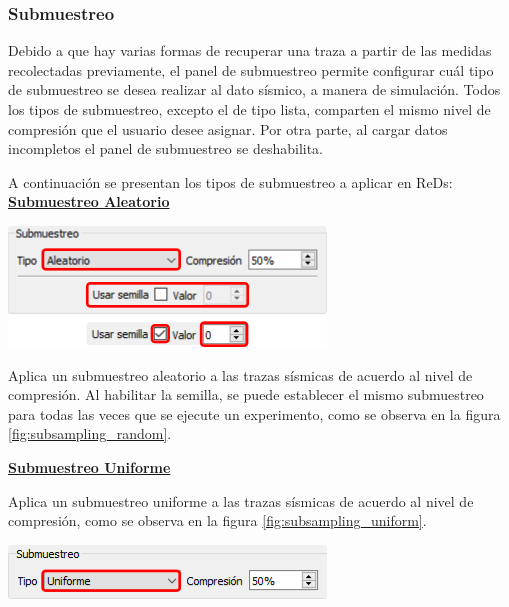 \documentclass[12pt,twoside,letter]{ol-softwaremanual}
\newcommand*\circled[1]{\tikz[baseline=(char.base)]{
            \node[shape=circle,draw,inner sep=2pt] (char) {#1};}}
\newenvironment{Figure}
  {\par\medskip\noindent\minipage{\linewidth}}
  {\endminipage\par\medskip}
\begin{document}
\subsubsection{Submuestreo}\label{subsampling}

Debido a que hay varias formas de recuperar una traza a partir de las medidas recolectadas previamente, el panel de submuestreo \circled{4} permite configurar cuál tipo de submuestreo se desea realizar al dato sísmico, a manera de simulación. Todos los tipos de submuestreo, excepto el de tipo lista, comparten el mismo nivel de compresión que el usuario desee asignar. Por otra parte, al cargar datos incompletos el panel de submuestreo se deshabilita.

A continuación se presentan los tipos de submuestreo a aplicar en ReDs:\\

\underline{\textbf{Submuestreo Aleatorio}}

\begin{multicols}{2}
\begin{Figure}
	\centering
	\includegraphics[width=0.8\linewidth]{subsampling-random.png}
	\label{fig:subsampling_random}
\end{Figure}

Aplica un submuestreo aleatorio a las trazas sísmicas de acuerdo al nivel de compresión. Al habilitar la semilla, se puede establecer el mismo submuestreo para todas las veces que se ejecute un experimento, como se observa en la figura \ref{fig:subsampling_random}.

\end{multicols}

\underline{\textbf{Submuestreo Uniforme}}

\begin{multicols}{2}

Aplica un submuestreo uniforme a las trazas sísmicas de acuerdo al nivel de compresión, como se observa en la figura \ref{fig:subsampling_uniform}.

\begin{Figure}
    \centering
    \includegraphics[width=0.8\linewidth]{subsampling-uniform.png}
    \label{fig:subsampling_uniform}
\end{Figure}

\end{multicols}
\end{document}
